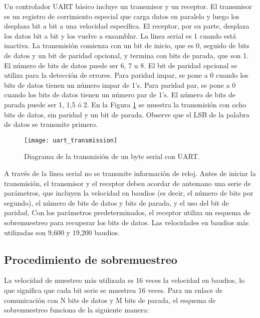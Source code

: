     Un controlador UART básico incluye un transmisor y un receptor. El transmisor es un registro de corrimiento especial que carga datos en paralelo y luego los desplaza bit a bit a una velocidad específica. El receptor, por su parte, desplaza los datos bit a bit y los vuelve a ensamblar. La línea serial es 1 cuando está inactiva. La transmisión comienza con un bit de inicio, que es 0, seguido de bits de datos y un bit de paridad opcional, y termina con bits de parada, que son 1. El número de bits de datos puede ser 6, 7 u 8. El bit de paridad opcional se utiliza para la detección de errores. Para paridad impar, se pone a 0 cuando los bits de datos tienen un número impar de 1's. Para paridad par, se pone a 0 cuando los bits de datos tienen un número par de 1's. El número de bits de parada puede ser 1, 1,5 ó 2. En la Figura \ref{fig:uart_transmission} se muestra la transmisión con ocho bits de datos, sin paridad y un bit de parada. Observe que el LSB de la palabra de datos se transmite primero.

    \begin{figure}[hbtp]
      \centering
      \texttt{[image: uart\_transmission]}
      \caption{Diagrama de la transmisión de un byte serial con UART.}
      \label{fig:uart_transmission}
    \end{figure}

    A través de la línea serial no se transmite información de reloj. Antes de iniciar la transmisión, el transmisor y el receptor deben acordar de antemano una serie de parámetros, que incluyen la velocidad en baudios (es decir, el número de bits por segundo), el número de bits de datos y bits de parada, y el uso del bit de paridad. Con los parámetros predeterminados, el receptor utiliza un esquema de sobremuestreo para recuperar los bits de datos. Las velocidades en baudios más utilizadas son 9,600 y 19,200 baudios.

    \subsection{Procedimiento de sobremuestreo}

    La velocidad de muestreo más utilizada es 16 veces la velocidad en baudios, lo que significa que cada bit serie se muestrea 16 veces. Para un enlace de comunicación con N bits de datos y M bits de parada, el esquema de sobremuestreo funciona de la siguiente manera:
    
